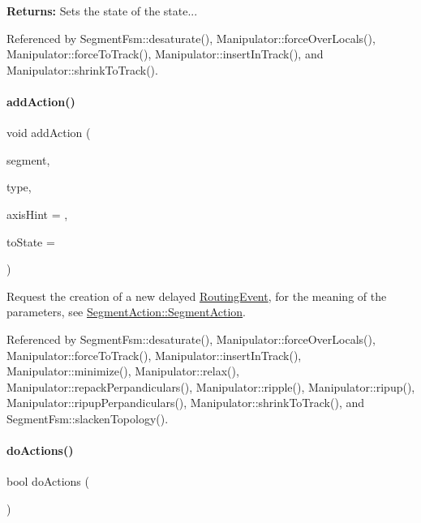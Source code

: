 {\bfseries Returns\+:} Sets the state of the state... 

Referenced by Segment\+Fsm\+::desaturate(), Manipulator\+::force\+Over\+Locals(), Manipulator\+::force\+To\+Track(), Manipulator\+::insert\+In\+Track(), and Manipulator\+::shrink\+To\+Track().

\mbox{\label{classKite_1_1SegmentFsm_ad9384c1cc2a9cd70ab9ff089b56380a0}} 
\paragraph{\texorpdfstring{add\+Action()}{addAction()}}
{\footnotesize\ttfamily void add\+Action (\begin{DoxyParamCaption}\item[{\mbox{\hyperlink{classKite_1_1TrackElement}{Track\+Element}} $\ast$}]{segment,  }\item[{unsigned int}]{type,  }\item[{\textbf{ Db\+U\+::\+Unit}}]{axis\+Hint = {},  }\item[{unsigned int}]{to\+State = {} }\end{DoxyParamCaption})}

Request the creation of a new delayed \mbox{\hyperlink{classKite_1_1RoutingEvent}{Routing\+Event}}, for the meaning of the parameters, see \mbox{\hyperlink{classKite_1_1SegmentAction_acbeca58f8327b69a540628f299d5bd35}{Segment\+Action\+::\+Segment\+Action}}. 

Referenced by Segment\+Fsm\+::desaturate(), Manipulator\+::force\+Over\+Locals(), Manipulator\+::force\+To\+Track(), Manipulator\+::insert\+In\+Track(), Manipulator\+::minimize(), Manipulator\+::relax(), Manipulator\+::repack\+Perpandiculars(), Manipulator\+::ripple(), Manipulator\+::ripup(), Manipulator\+::ripup\+Perpandiculars(), Manipulator\+::shrink\+To\+Track(), and Segment\+Fsm\+::slacken\+Topology().

\mbox{\label{classKite_1_1SegmentFsm_abbcf429498049478d4d8ab94cdb4a022}} 
\paragraph{\texorpdfstring{do\+Actions()}{doActions()}}
{\footnotesize\ttfamily bool do\+Actions (\begin{DoxyParamCaption}{ }\end{DoxyParamCaption})}

